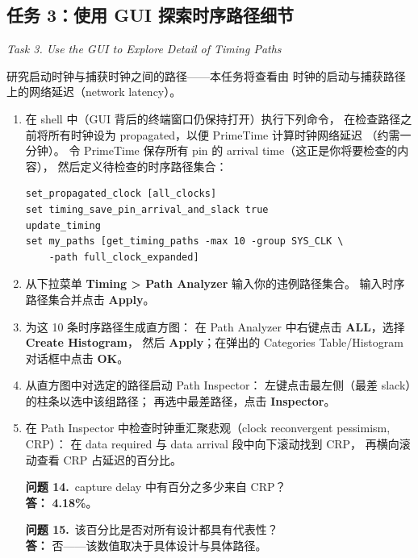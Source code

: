 \subsection{任务 3：使用 GUI 探索时序路径细节}
\label{lab4:task3}

\noindent\textit{Task 3. Use the GUI to Explore Detail of Timing Paths}

研究启动时钟与捕获时钟之间的路径——本任务将查看由  时钟的启动与捕获路径上的网络延迟（network latency）。

\begin{enumerate}
  \item 在 shell 中（GUI 背后的终端窗口仍保持打开）执行下列命令，
        在检查路径之前将所有时钟设为 propagated，以便 PrimeTime 计算时钟网络延迟
        （约需一分钟）。
        令 PrimeTime 保存所有 pin 的 arrival time（这正是你将要检查的内容），
        然后定义待检查的时序路径集合：
\begin{lstlisting}
set_propagated_clock [all_clocks]
set timing_save_pin_arrival_and_slack true
update_timing
set my_paths [get_timing_paths -max 10 -group SYS_CLK \
    -path full_clock_expanded]
\end{lstlisting}

  \item 从下拉菜单 \textbf{Timing > Path Analyzer} 输入你的违例路径集合。
        输入时序路径集合并点击 \textbf{Apply}。

  \item 为这 10 条时序路径生成直方图：
        在 Path Analyzer 中右键点击 \textbf{ALL}，选择 \textbf{Create Histogram}，
        然后 \textbf{Apply}；在弹出的 Categories Table/Histogram 对话框中点击 \textbf{OK}。

  \item 从直方图中对选定的路径启动 Path Inspector：
        左键点击最左侧（最差 slack）的柱条以选中该组路径；
        再选中最差路径，点击 \textbf{Inspector}。

  \item 在 Path Inspector 中检查时钟重汇聚悲观（clock reconvergent pessimism, CRP）：
        在 data required 与 data arrival 段中向下滚动找到 CRP，
        再横向滚动查看 CRP 占延迟的百分比。

\begin{questionBox}
\textbf{问题 14.}\ capture delay 中有百分之多少来自 CRP？\\[0.35em]
\textbf{答：} \textbf{4.18\%}。

\textbf{问题 15.}\ 该百分比是否对所有设计都具有代表性？\\[0.35em]
\textbf{答：} 否——该数值取决于具体设计与具体路径。
\end{questionBox}


\end{enumerate}
